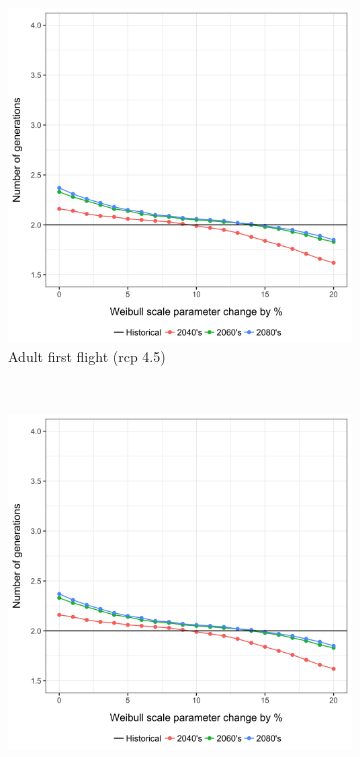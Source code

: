 \documentclass[12pt]{article}
\theoremstyle{plain}
\theoremstyle{definition}
\theoremstyle{definition}
\begin{document}
\begin{figure}[h!]
    \hspace{.1in}
    \begin{subfigure}[b]{0.5\textwidth}
        \includegraphics[width=\textwidth]{figures/sensitivity/weibull_scale/sensitivity_figures/rcp45_Adult_Aug_scale_sens_cold}
        \caption{Adult first flight (rcp 4.5)}
        \label{fig:aff_45}
    \end{subfigure}
     \hspace{-.1in}
    ~ %
    \begin{subfigure}[b]{0.5\textwidth}
        \includegraphics[width=\textwidth]{figures/sensitivity/weibull_scale/sensitivity_figures/rcp45_Adult_Aug_scale_sens_cold}

\end{subfigure}
\end{figure}
\end{document}
